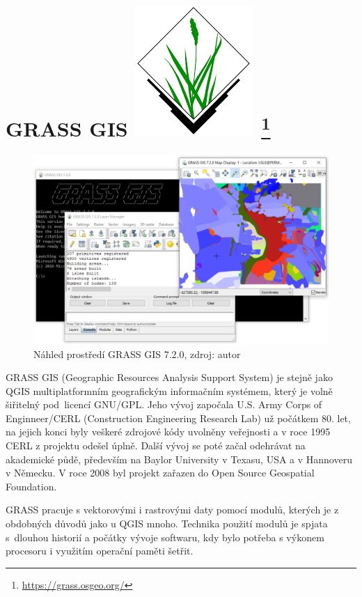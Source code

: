 \section[GRASS GIS]{GRASS GIS \includegraphics[scale=0.12]
{./pictures/grass.png} \footnote{\url{https://grass.osgeo.org/}}}
\label{grassgis}
\begin{figure}[H]
    \centering \includegraphics[scale=0.6]{./pictures/grass_screen.png}
      \caption[Náhled prostředí GRASS GIS 7.2.0]
      {Náhled prostředí GRASS GIS 7.2.0, zdroj: autor}
      \label{screen:grass}
\end{figure}
GRASS GIS (Geographic Resources Analysis Support System) je stejně
jako QGIS multiplatformním geografickým informačním systémem, který je
volně šiřitelný pod~licencí GNU/GPL. Jeho vývoj započala U.S. Army
Corps of Enginneer/CERL (Construction Engineering Research Lab) už
počátkem 80. let, na jejich konci byly veškeré zdrojové kódy uvolněny
veřejnosti a v roce 1995 CERL z projektu odešel úplně. Další vývoj se
poté začal odehrávat na akademické půdě, především na Baylor
University v Texasu, USA a v Hannoveru v Německu. V roce 2008 byl
projekt zařazen do Open Source Geospatial Foundation.

GRASS pracuje s vektorovými i rastrovými daty pomocí modulů, kterých
je z obdobných důvodů jako u QGIS mnoho. Technika použití modulů je
spjata s~dlouhou historií a počátky vývoje softwaru, kdy bylo potřeba
s výkonem procesoru i využitím operační paměti šetřit.

